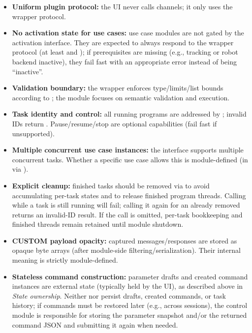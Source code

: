 \begin{itemize}
    \item \textbf{Uniform plugin protocol:} the UI never calls \DIFdelbegin {}\DIFdelend \DIFaddbegin {}\DIFaddend channels; it only uses the wrapper protocol.
    \item \textbf{No activation state for use cases:} use case modules are not gated by the activation interface. They are expected to always respond to the wrapper protocol (at least  and ); if prerequisites are missing (e.g., tracking or robot backend inactive), they fail fast with an appropriate error instead of being ``inactive''.
    \item \textbf{Validation boundary:} the wrapper enforces type/limits/list bounds according to ; the module focuses on semantic validation and execution.
    \item \textbf{Task identity and control:} all running programs are addressed by ; invalid IDs return . Pause/resume/stop are optional capabilities (fail fast if unsupported).
    \item \textbf{Multiple concurrent use case instances:} the interface supports multiple concurrent tasks. Whether a specific use case allows this is module-defined (in  via ).
    \item \textbf{Explicit cleanup:} finished tasks should be removed via  to avoid accumulating per-task states and to release finished program threads. Calling  while a task is still running will fail; calling it again for an already removed  returns an invalid-ID result. If the call is omitted, per-task bookkeeping and finished threads remain retained until module shutdown.
    \item \textbf{CUSTOM payload opacity:} captured messages/responses are stored as opaque byte arrays (after module-side filtering/serialization). Their internal meaning is strictly module-defined.
    \item \textbf{Stateless command construction:} parameter drafts and created command instances are external state (typically held by the UI), as described above in \emph{State ownership}. Neither  nor  persist drafts, created commands, or task history; if commands must be restored later (e.g., across sessions), the control module is responsible for storing the parameter snapshot and/or the returned command JSON and submitting it again when needed.
\end{itemize}





